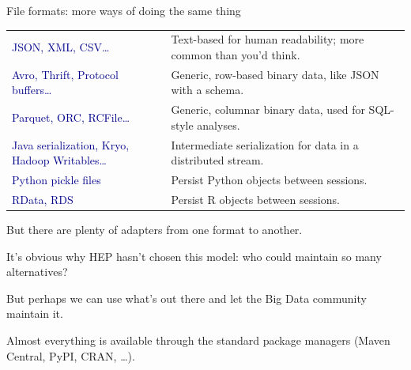 \documentclass{beamer}
\begin{document}
\begin{frame}{File formats: more ways of doing the same thing}

\vfill
\hspace{-0.4 cm}\begin{minipage}{\linewidth}
\renewcommand{\arraystretch}{1.5}
\begin{tabular}{p{0.4\linewidth} p{0.6\linewidth}}
\textcolor{darkblue}{JSON, XML, CSV\ldots} & Text-based for human readability; more common than you'd think. \\
\raggedright \textcolor{darkblue}{Avro, Thrift, Protocol buffers\ldots} & Generic, row-based binary data, like JSON with a schema. \\
\textcolor{darkblue}{Parquet, ORC, RCFile\ldots} & Generic, columnar binary data, used for SQL-style analyses. \\
\raggedright \textcolor{darkblue}{Java serialization, Kryo, Hadoop Writables\ldots} & Intermediate serialization for data in a distributed stream. \\
\textcolor{darkblue}{Python pickle files} & Persist Python objects between sessions. \\
\textcolor{darkblue}{RData, RDS} & Persist R objects between sessions. \\
\end{tabular}
\end{minipage}
\vfill

But there are plenty of adapters from one format to another.
\vfill
\end{frame}

\begin{frame}{}
\begin{center}
\begin{minipage}{0.8\linewidth}
It's obvious why HEP hasn't chosen this model: who could maintain so many alternatives?

\vspace{1.5 cm}
But perhaps we can use what's out there and let the Big Data community maintain it.

\vspace{1.5 cm}
Almost everything is available through the standard package managers (Maven Central, PyPI, CRAN, \ldots).
\end{minipage}
\end{center}
\end{frame}
\end{document}
